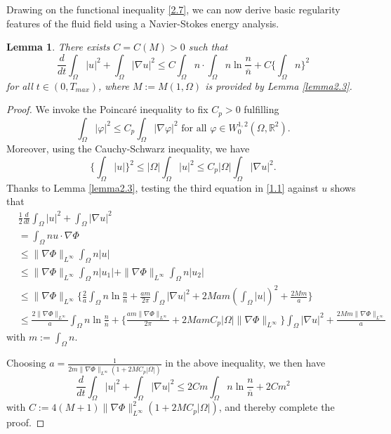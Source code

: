 \documentclass[12pt]{article}
\theoremstyle{plain}
\newtheorem{lemma}{Lemma}[section]
\theoremstyle{definition}
\numberwithin{equation}{section}
\begin{document}
Drawing on the functional inequality \eqref{2.7}, we can now derive basic regularity features of the fluid field using a Navier-Stokes energy analysis.

\begin{lemma}\label{lemma3.4}
There exists $C=C(M)>0$ such that
\begin{equation}\label{3.14}
\frac d{dt}\int_\Omega|u|^2
+\int_\Omega|\nabla u|^2
\leq C \int_\Omega n \cdot\int_\Omega n\ln\frac n{\overline n}+C\{\int_\Omega n\}^2
\end{equation}for all $t\in (0,T_{max})$, where $M:=M(1,\Omega)$ is provided by Lemma \ref{lemma2.3}.
\end{lemma}
\begin{proof}[Proof]
We invoke the Poincar\'{e} inequality to fix $C_p>0$ fulfilling
\begin{equation*}
\int_\Omega|\varphi|^2\leq C_p\int_\Omega|\nabla\varphi|^2\mbox{ for all }\varphi\in W_0^{1,2}(\Omega,\mathbb{R}^2).
\end{equation*}
Moreover, using the Cauchy-Schwarz inequality, we have
\begin{equation}\label{3.15}
\bigg\{\int_\Omega|u|\bigg\}^2
\leq|\Omega|\int_\Omega|u|^2
\leq C_p|\Omega|\int_\Omega|\nabla u|^2.
\end{equation}
Thanks to Lemma \ref{lemma2.3}, testing the third equation in \eqref{1.1} against $u$ shows that
\begin{equation*}
\begin{split}
&\frac1 2\frac d{dt}\int_\Omega|u|^2+\int_\Omega|\nabla u|^2\\
&=
\int_\Omega nu\cdot\nabla\Phi\\
&\leq
\|\nabla\Phi\|_{L^\infty}\int_\Omega n|u|\\
&\leq
\|\nabla\Phi\|_{L^\infty}\int_\Omega n|u_1|
+\|\nabla\Phi\|_{L^\infty}\int_\Omega n|u_2|\\
&\leq
\|\nabla\Phi\|_{L^\infty}
\bigg\{\frac2{a}\int_\Omega n\ln\frac n{\overline{n}}
+\frac{am}{2\pi}\int_\Omega|\nabla u|^2
+2Mam(\int_\Omega |u|)^2+\frac{2Mm}{a}\bigg\}\\
&\leq
\frac{2\|\nabla\Phi\|_{L^\infty}}{a}
\int_\Omega n\ln\frac n{\overline{n}}
+\bigg\{\frac{am\|\nabla\Phi\|_{L^\infty}}{2\pi}
+2MamC_p|\Omega|\|\nabla\Phi\|_{L^\infty}\bigg\}
\int_\Omega|\nabla u|^2
+\frac{2Mm\|\nabla\Phi\|_{L^\infty}}{a}
\end{split}
\end{equation*}
with $m:=\int_\Omega n$.

Choosing $a=\frac1{2m\|\nabla\Phi\|_{L^\infty}(1+2MC_p|\Omega|)}$ in the above inequality,
we then have
\begin{equation*}
\frac d{dt}\int_\Omega|u|^2
+\int_\Omega|\nabla u|^2\leq 2Cm\int_\Omega n\ln\frac n{\overline{n}}+2Cm^2
\end{equation*}
with $C:=4(M+1)\|\nabla\Phi\|_{L^\infty}^2(1+2MC_p|\Omega|)$, and thereby complete the proof.
\end{proof}
\end{document}
